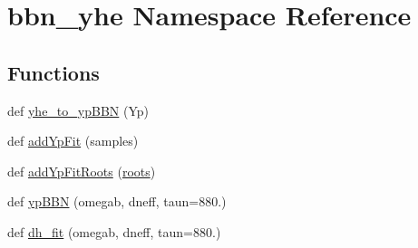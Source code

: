 \hypertarget{namespacebbn__yhe}{}\section{bbn\+\_\+yhe Namespace Reference}
\label{namespacebbn__yhe}
\subsection*{Functions}
\begin{DoxyCompactItemize}
\item 
def \mbox{\hyperlink{namespacebbn__yhe_a38c5abbad8fad900f60f86b5038cf0e8}{yhe\+\_\+to\+\_\+yp\+B\+BN}} (Yp)
\item 
def \mbox{\hyperlink{namespacebbn__yhe_a207fd25c1dedf810f926879ba5899d38}{add\+Yp\+Fit}} (samples)
\item 
def \mbox{\hyperlink{namespacebbn__yhe_ab07e92f80f62d425303d08e5e8fe604d}{add\+Yp\+Fit\+Roots}} (\mbox{\hyperlink{namespacebbn__yhe_ab2add45031a3e0b76e777d91fd6eff67}{roots}})
\item 
def \mbox{\hyperlink{namespacebbn__yhe_a0ae2fc2b1719f17ae48ec9dee3de6728}{yp\+B\+BN}} (omegab, dneff, taun=880.)
\item 
def \mbox{\hyperlink{namespacebbn__yhe_a3e9988b282cca4d66a7481dbf9676939}{dh\+\_\+fit}} (omegab, dneff, taun=880.)
\end{DoxyCompactItemize}
